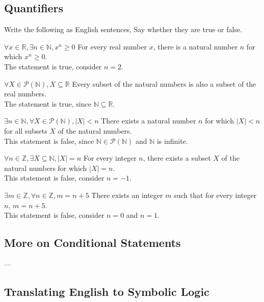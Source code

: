 \documentclass[DIN, pagenumber=false, fontsize=11pt, parskip=half]{scrartcl}
\begin{document}
\subsection{Quantifiers}

\begin{exercise}{}
    Write the following as English sentences, Say whether they are true or false.
\end{exercise}

\begin{problems}
    \problem $\forall x \in \mathbb{R}, \exists n \in \mathbb{N}, x^n \geq 0$
    \answer For every real number $x$, there is a natural number $n$ for which $x^n \geq 0$.\\ 
    The statement is true, consider $n = 2$.

    \problem $\forall X \in \mathcal{P}(\mathbb{N}), X \subseteq \mathbb{R}$
    \answer Every subset of the natural numbers is also a subset of the real numbers.\\
    The statement is true, since $\mathbb{N} \subseteq \mathbb{R}$.

    \problem $\exists n \in \mathbb{N}, \forall X \in \mathcal{P}(\mathbb{N}), |X| < n$
    \answer There exists a natural number $n$ for which $|X| < n$ for all subsets $X$ of the natural numbers.\\ 
    This statement is false, since $\mathbb{N} \in \mathcal{P}(\mathbb{N})$ and $\mathbb{N}$ is infinite.

    \problem $\forall n \in \mathbb{Z}, \exists X \subseteq \mathbb{N}, |X| = n$
    \answer For every integer $n$, there exists a subset $X$ of the natural numbers for which $|X| = n$.\\ 
    This statement is false, consider $n = -1$.

    \problem $\exists m \in \mathbb{Z}, \forall n \in \mathbb{Z}, m = n + 5$
    \answer There exists an integer $m$ such that for every integer $n$, $m = n + 5$.\\ 
    This statement is false, consider $n = 0$ and $n = 1$.
\end{problems}

\subsection{More on Conditional Statements}

---

\subsection{Translating English to Symbolic Logic}
\end{document}
